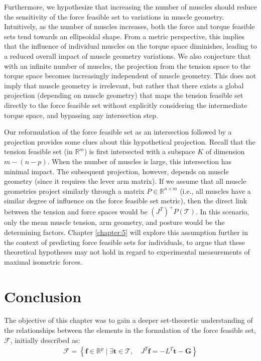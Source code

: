 Furthermore, we hypothesize that increasing the number of muscles should reduce the sensitivity of the force feasible set to variations in muscle geometry. Intuitively, as the number of muscles increases, both the force and torque feasible sets tend towards an ellipsoidal shape. From a metric perspective, this implies that the influence of individual muscles on the torque space diminishes, leading to a reduced overall impact of muscle geometry variations. We also conjecture that with an infinite number of muscles, the projection from the tension space to the torque space becomes increasingly independent of muscle geometry. This does not imply that muscle geometry is irrelevant, but rather that there exists a global projection (depending on muscle geometry) that maps the tension feasible set directly to the force feasible set without explicitly considering the intermediate torque space, and bypassing any intersection step.

Our reformulation of the force feasible set as an intersection followed by a projection provides some clues about this hypothetical projection. Recall that the tension feasible set (in $\mathbb{R}^m$) is first intersected with a subspace $K$ of dimension $m - (n - p)$. When the number of muscles is large, this intersection has minimal impact. The subsequent projection, however, depends on muscle geometry (since it requires the lever arm matrix). If we assume that all muscle geometries project similarly through a matrix $P \in \mathbb{R}^{n \times m}$ (i.e., all muscles have a similar degree of influence on the force feasible set metric), then the direct link between the tension and force spaces would be $(J^T)^+ P(\mathcal{T})$. In this scenario, only the mean muscle tension, arm geometry, and posture would be the determining factors. Chapter \ref{chapter:5} will explore this assumption further in the context of predicting force feasible sets for individuals, to argue that these theoretical hypotheses may not hold in regard to experimental measurements of maximal isometric forces.

\section{Conclusion}
\label{sec:approx_discussion}

The objective of this chapter was to gain a deeper set-theoretic understanding of the relationships between the elements in the formulation of the force feasible set, $\mathcal{F}$, initially described as:
\begin{align*}
\mathcal{F} = \left\{ \mathbf{f}\in \mathbb{R}^p \mid \exists \mathbf{t}\in\mathcal{T},\quad J^T\mathbf{f} = -L^T\mathbf{t} - \mathbf{G} \right\}
\end{align*}


